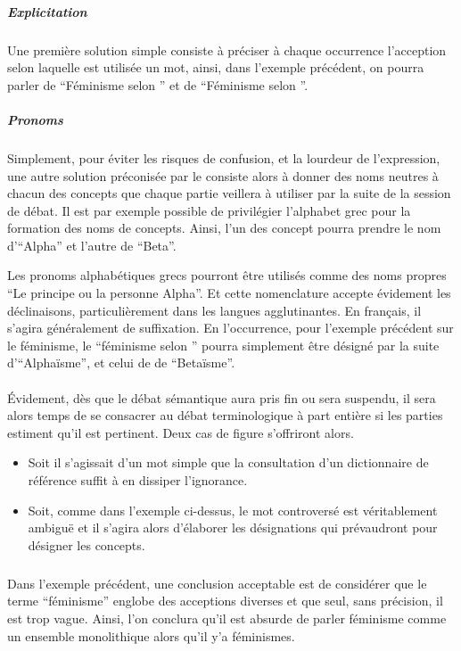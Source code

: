 \paragraph{}
\subparagraph{Explicitation}
Une première solution simple consiste à préciser à chaque occurrence l’acception selon laquelle est utilisée un mot, ainsi, dans l’exemple précédent, on pourra parler de \enquote{Féminisme selon \A} et de \enquote{Féminisme selon \B}.

\subparagraph{Pronoms}
Simplement, pour éviter les risques de confusion, et la lourdeur de l’expression, une autre solution préconisée par le \mainabbr{} consiste alors à donner des noms neutres à chacun des concepts que chaque partie veillera à utiliser par la suite de la session de débat. Il est par exemple possible de privilégier l’alphabet grec pour la formation des noms de concepts. Ainsi, l’un des concept pourra prendre le nom d’\enquote{Alpha} et l’autre de \enquote{Beta}.

Les pronoms alphabétiques grecs pourront être utilisés comme des noms propres \enquote{Le principe ou la personne Alpha}. Et cette nomenclature accepte évidement les déclinaisons, particulièrement dans les langues agglutinantes. En français, il s’agira généralement de suffixation. En l’occurrence, pour l’exemple précédent sur le féminisme, le \enquote{féminisme selon \A} pourra simplement être désigné par la suite d’\enquote{Alphaïsme}, et celui de \B de \enquote{Betaïsme}.

\paragraph{}
Évidement, dès que le débat sémantique aura pris fin ou sera suspendu, il sera alors temps de se consacrer au débat terminologique à part entière si les parties estiment qu’il est pertinent. Deux cas de figure s’offriront alors.
\begin{itemize}
  \item Soit il s’agissait d’un mot simple que la consultation d’un dictionnaire de référence suffit à en dissiper l’ignorance.

  \item Soit, comme dans l’exemple ci-dessus, le mot controversé est véritablement ambiguë et il s’agira alors d’élaborer les désignations qui prévaudront pour désigner les concepts.
\end{itemize}

\subparagraph{}
Dans l’exemple précédent, une conclusion acceptable est de considérer que le terme \enquote{féminisme} englobe des acceptions diverses et que seul, sans précision, il est trop vague. Ainsi, l’on conclura qu’il est absurde de parler  féminisme comme un ensemble monolithique alors qu’il y’a  féminismes.


